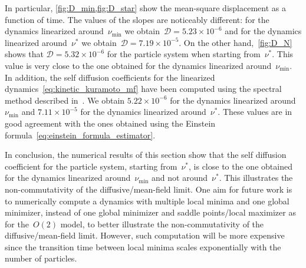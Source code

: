 \documentclass[onefignum,onetabnum]{siamart251216} %
\newcommand{\mc}[1]{\mathcal{#1}}
\theoremstyle{plain}
\numberwithin{equation}{section}
\numberwithin{theorem}{section}
\begin{document}
In particular,
\cref{fig:D_min,fig:D_star} show the mean-square displacement as a function of time.
The values of the slopes are noticeably different: for the dynamics linearized around~$\nu_{\min}$ we obtain~$\mc{D} = 5.23\times 10^{-6}$ and for the dynamics linearized around~$\nu^*$ we obtain~$\mc{D} = 7.19\times 10^{-5}$.
On the other hand,~\cref{fig:D_N} shows that $\mc{D}= 5.32\times 10^{-6}$ for the particle system when starting from~$\nu^*$. This value is very close to the one obtained for the dynamics linearized around~$\nu_{\min}$. In addition, the self diffusion coefficients for the linearized dynamics~\eqref{eq:kinetic_kuramoto_mf} have been computed using the spectral method described in~\cite[Section 4]{pavliotis2008diffusive}. We obtain
$5.22\times 10^{-6}$ for the dynamics linearized around~$\nu_{\min}$ and $7.11\times 10^{-5}$ for the dynamics linearized around~$\nu^*$. These values are in good agreement with the ones obtained using the Einstein formula~\eqref{eq:einstein_formula_estimator}.

In conclusion, the numerical results of this section show that the self diffusion coefficient for the particle system, starting from~$\nu^*$, is close to the one obtained for the dynamics linearized around~$\nu_{\min}$ and not around~$\nu^*$. This illustrates the non-commutativity of the diffusive/mean-field limit. One aim for future work is to numerically compute a dynamics with multiple local minima and one global minimizer, instead of one global minimizer and saddle points/local maximizer as for the~$O(2)$ model, to better illustrate the non-commutativity of the diffusive/mean-field limit. However, such computation will be more expensive since the transition time between local minima scales exponentially with the number of particles.
\appendix
\end{document}
